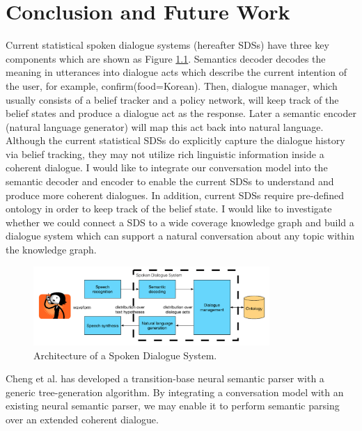 \documentclass[bsc,frontabs,twoside,singlespacing,parskip,deptreport]{infthesis}     %
\begin{document}
\chapter{Conclusion and Future Work}




Current statistical spoken dialogue systems (hereafter SDSs) have three key components which are shown as Figure \ref{fig:sds}. Semantics decoder decodes the meaning in utterances into dialogue acts which describe the current intention of the user, for example, confirm(food=Korean). Then, dialogue manager, which usually consists of a belief tracker and a policy network, will keep track of the belief states and produce a dialogue act as the response. Later a semantic encoder (natural language generator) will map this act back into natural language. Although the current statistical SDSs do explicitly capture the dialogue history via belief tracking, they may not utilize rich linguistic information inside a coherent dialogue. I would like to integrate our conversation model into the semantic decoder and encoder to enable the current SDSs to understand and produce more coherent dialogues. In addition, current SDSs require pre-defined ontology in order to keep track of the belief state. I would like to investigate whether we could connect a SDS to a wide coverage knowledge graph and build a dialogue system which can support a natural conversation about any topic within the knowledge graph.

\begin{figure}[h]
    \centering
    \includegraphics[width=0.80\textwidth]{sds.png}
    \caption{Architecture of a Spoken Dialogue System.\cite{gasic}}
    \label{fig:sds}
\end{figure}

Cheng et al.\cite{cheng2019learning} has developed a transition-base neural semantic parser with a generic tree-generation algorithm. By integrating a conversation model with an existing neural semantic parser, we may enable it to perform semantic parsing over an extended coherent dialogue.



\end{document}
